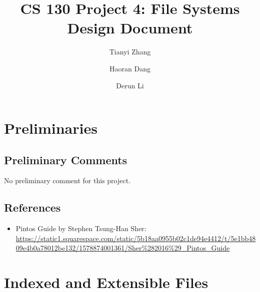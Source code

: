 \documentclass[sigconf, nonacm, balance=false, urlbreakonhyphens=true]{acmart}
\begin{document}
    \title{CS 130 Project 4: File Systems\\Design Document}

    \author{Tianyi Zhang}

    \author{Haoran Dang}

    \author{Derun Li}

    \maketitle

    \setcounter{section}{-1}

    \section{Preliminaries}
        \subsection{Preliminary Comments}

        No preliminary comment for this project. 

        \subsection{References}
        
            \begin{itemize}
                \item Pintos Guide by Stephen Tsung-Han Sher:  \url{https://static1.squarespace.com/static/5b18aa0955b02c1de94e4412/t/5e1bb4809e4b0a78012be132/1578874001361/Sher\%282016%29_Pintos_Guide}
            \end{itemize} 
    
    \section{Indexed and Extensible Files}
            
\end{document}
